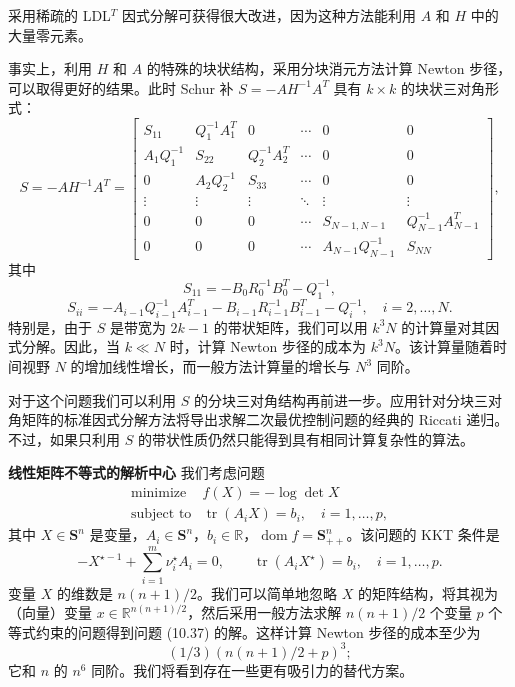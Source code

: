 \documentclass[UTF8, 12pt, fontset=fandol, oneside]{ctexart}
\begin{document}
采用稀疏的 LDL$^T$ 因式分解可获得很大改进，因为这种方法能利用 $A$ 和 $H$ 中的大量零元素。

事实上，利用 $H$ 和 $A$ 的特殊的块状结构，采用分块消元方法计算 Newton 步径，可以取得更好的结果。此时 Schur 补 $S=-AH^{-1}A^T$ 具有 $k\times k$ 的块状三对角形式：
\[
S=-AH^{-1}A^T
=
\begin{bmatrix}
S_{11}&Q_1^{-1}A_1^T&0&\cdots&0&0\\
A_1Q_1^{-1}&S_{22}&Q_2^{-1}A_2^T&\cdots&0&0\\
0&A_2Q_2^{-1}&S_{33}&\cdots&0&0\\
\vdots&\vdots&\vdots&\ddots&\vdots&\vdots\\
0&0&0&\cdots&S_{N-1,N-1}&Q_{N-1}^{-1}A_{N-1}^T\\
0&0&0&\cdots&A_{N-1}Q_{N-1}^{-1}&S_{NN}
\end{bmatrix},
\]
其中
\[
S_{11}=-B_0R_0^{-1}B_0^T-Q_1^{-1},
\]
\[
S_{ii}=-A_{i-1}Q_{i-1}^{-1}A_{i-1}^T-B_{i-1}R_{i-1}^{-1}B_{i-1}^T-Q_i^{-1},\quad i=2,\ldots,N.
\]
特别是，由于 $S$ 是带宽为 $2k-1$ 的带状矩阵，我们可以用 $k^3N$ 的计算量对其因式分解。因此，当 $k\ll N$ 时，计算 Newton 步径的成本为 $k^3N$。该计算量随着时间视野 $N$ 的增加线性增长，而一般方法计算量的增长与 $N^3$ 同阶。

对于这个问题我们可以利用 $S$ 的分块三对角结构再前进一步。应用针对分块三对角矩阵的标准因式分解方法将导出求解二次最优控制问题的经典的 Riccati 递归。不过，如果只利用 $S$ 的带状性质仍然只能得到具有相同计算复杂性的算法。

\noindent\textbf{线性矩阵不等式的解析中心}\quad
我们考虑问题
\begin{equation}
\begin{array}{ll}
\mbox{minimize} & f(X)=-\log\det X\\
\mbox{subject to} & \operatorname{tr}(A_iX)=b_i,\quad i=1,\ldots,p,
\end{array}
\tag{10.37}
\end{equation}
其中 $X\in\mathbf{S}^n$ 是变量，$A_i\in\mathbf{S}^n$，$b_i\in\mathbb{R}$，$\operatorname{dom} f=\mathbf{S}_{++}^n$。该问题的 KKT 条件是
\begin{equation}
-X^{\star -1}+\sum_{i=1}^m\nu_i^\star A_i=0,\qquad
\operatorname{tr}(A_iX^\star)=b_i,\quad i=1,\ldots,p.
\tag{10.38}
\end{equation}
变量 $X$ 的维数是 $n(n+1)/2$。我们可以简单地忽略 $X$ 的矩阵结构，将其视为（向量）变量 $x\in\mathbb{R}^{n(n+1)/2}$，然后采用一般方法求解 $n(n+1)/2$ 个变量 $p$ 个等式约束的问题得到问题 (10.37) 的解。这样计算 Newton 步径的成本至少为
\[
(1/3)(n(n+1)/2+p)^3;
\]
它和 $n$ 的 $n^6$ 同阶。我们将看到存在一些更有吸引力的替代方案。
\end{document}
